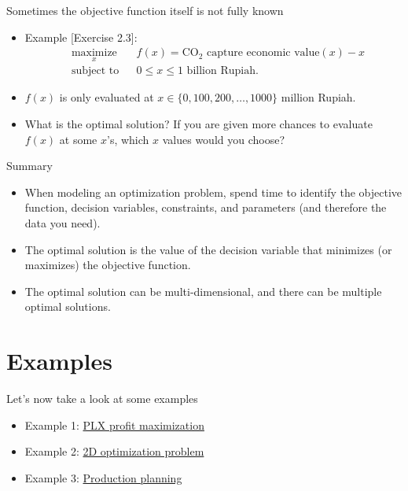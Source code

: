 \documentclass [xcolor=svgnames, handout]{beamer}
\begin{document}
\begin{frame}{Sometimes the objective function itself is not fully known}
    \begin{itemize}[<+->]
        \item Example [Exercise 2.3]:
        \begin{equation}
            \begin{aligned}
                & \underset{x}{\text{maximize}}
                & & f(x) = \text{CO}_2 \text{ capture economic value}(x) - x \\
                & \text{subject to}
                & & 0 \leq x \leq 1 \text{ billion Rupiah}.
            \end{aligned}
            \label{eq:Qertamina_optimization}
        \end{equation}
        \item $f(x)$ is only evaluated at $x \in \{0, 100, 200, \ldots, 1000\}$ million Rupiah. 
        \begin{figure}
            \centering
            
        \end{figure}
        \item What is the optimal solution? If you are given more chances to evaluate $f(x)$ at some $x$'s, which $x$ values would you choose?
        
    \end{itemize}
\end{frame}

\begin{frame}{Summary}
    \begin{itemize}[<+->]
        \item When modeling an optimization problem, spend time to identify the objective function, decision variables, constraints, and parameters (and therefore the data you need).
        \item The optimal solution is the value of the decision variable that minimizes (or maximizes) the objective function.
        \item The optimal solution can be multi-dimensional, and there can be multiple optimal solutions.
    \end{itemize}
\end{frame}

\section{Examples}
\begin{frame}{Let's now take a look at some examples}
    \begin{itemize}[<+->]
        \item Example 1: \href{https://colab.research.google.com/drive/1fkSbxvqUKUXSYWVWAXwGBWoc-8NCRFHS?usp=sharing}{PLX profit maximization}
        \item Example 2: \href{https://colab.research.google.com/drive/1dvgO3HJ0mT7kNphkEqfGdHYISbJ2lT_r?usp=sharing}{2D optimization problem}
        \item Example 3: \href{https://colab.research.google.com/drive/1wPqfn7aTNdO3aikmQnaeyLAeLD4yh4VK?usp=sharing}{Production planning}
    \end{itemize}
\end{frame}
\end{document}

